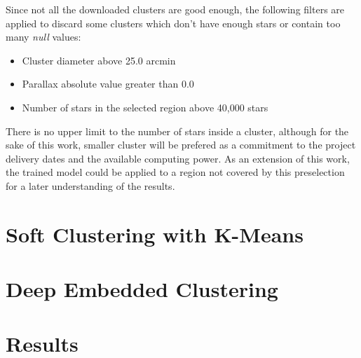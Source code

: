 \documentclass[11pt, a4paper, english]{book}
\begin{document}
Since not all the downloaded clusters are good enough, the following filters are applied to discard some clusters which don't have enough stars or contain too
many \emph{null} values:

\begin{itemize}
  \item Cluster diameter above 25.0 arcmin
  \item Parallax absolute value greater than 0.0
  \item Number of stars in the selected region above 40,000 stars
\end{itemize}

There is no upper limit to the number of stars inside a cluster, although for the sake of this work, smaller cluster will be prefered as
a commitment to the project delivery dates and the available computing power. As an extension of this work, the trained model could be applied to a region
not covered by this preselection for a later understanding of the results.


\section{Soft Clustering with K-Means}


\section{Deep Embedded Clustering}


\section{Results}



\end{document}
